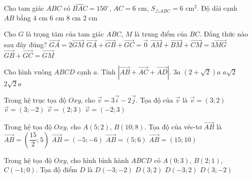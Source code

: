 \begin{ex}%
	Cho tam giác $ABC$ có $\widehat{BAC}=150^\circ$, $AC=6$ cm, $S_{\triangle ABC}=6$ cm$^2$. Độ dài cạnh $AB$ bằng
	\choice
	{$4$ cm}
	{$6$ cm}
	{$8$ cm}
	{\True $2$ cm}
\end{ex}
\begin{ex}%
	Cho $G$ là trọng tâm của tam giác $ABC$, $M$ là trung điểm của $BC$. Đẳng thức nào sau đây đúng?
	\choice
	{$\vec{GA}=2\vec{GM}$}
	{\True $\vec{GA}+\vec{GB}+\vec{GC}=\vec{0}$}
	{$\vec{AM}+\vec{BM}+\vec{CM}=3\vec{MG}$}
	{$\vec{GB}+\vec{GC}=\vec{GM}$}
\end{ex}
\begin{ex}%
	Cho hình vuông $ABCD$ cạnh $a$. Tính $\left|\vec{AB}+\vec{AC}+\vec{AD}\right|$.
	\choice
	{$3a$}
	{$(2+\sqrt{2})a$}
	{$a\sqrt{2}$}
	{\True $2\sqrt{2}a$}
\end{ex}
\begin{ex}%
	Trong hệ trục tọa độ $Oxy$, cho $\vec{v}=3\vec{i}-2\vec{j}$. Tọa độ của $\vec{v}$ là
	\choice
	{$\vec{v}=(3;2)$}
	{\True $\vec{v}=(3;-2)$}
	{$\vec{v}=(2;3)$}
	{$\vec{v}=(-2;3)$}
\end{ex}
\begin{ex}%
	Trong hệ tọa độ $Oxy$, cho $A(5;2)$, $B(10;8)$. Tọa độ của véc-tơ $\vec{AB}$ là
	\choice
	{$\vec{AB}=\left(\dfrac{15}{2};5\right)$}
	{$\vec{AB}=(-5;-6)$}
	{\True $\vec{AB}=(5;6)$}
	{$\vec{AB}=(15;10)$}
\end{ex}
\begin{ex}%
	Trong hệ tọa độ $Oxy$, cho hình bình hành $ABCD$ có $A(0;3)$, $B(2;1)$, $C(-1;0)$. Tọa độ điểm $D$ là
	\choice
	{$D(-3;-2)$}
	{$D(3;2)$}
	{\True $D(-3;2)$}
	{$D(3;-2)$}
\end{ex}
